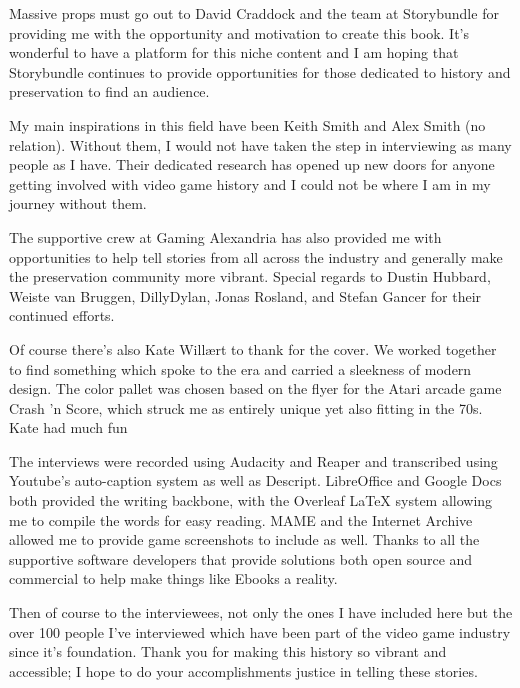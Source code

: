 \quad Massive props must go out to David Craddock and the team at Storybundle for providing me with the opportunity and motivation to create this book. It’s wonderful to have a platform for this niche content and I am hoping that Storybundle continues to provide opportunities for those dedicated to history and preservation to find an audience.

My main inspirations in this field have been Keith Smith and Alex Smith (no relation). Without them, I would not have taken the step in interviewing as many people as I have. Their dedicated research has opened up new doors for anyone getting involved with video game history and I could not be where I am in my journey without them.

The supportive crew at Gaming Alexandria has also provided me with opportunities to help tell stories from all across the industry and generally make the preservation community more vibrant. Special regards to Dustin Hubbard, Weiste van Bruggen, DillyDylan, Jonas Rosland, and Stefan Gancer for their continued efforts.

Of course there’s also Kate Willært to thank for the cover. We worked together to find something which spoke to the era and carried a sleekness of modern design. The color pallet was chosen based on the flyer for the Atari arcade game Crash 'n Score, which struck me as entirely unique yet also fitting in the 70s. Kate had much fun

The interviews were recorded using Audacity and Reaper and transcribed using Youtube’s auto-caption system as well as Descript. LibreOffice and Google Docs both provided the writing backbone, with the Overleaf LaTeX system allowing me to compile the words for easy reading. MAME and the Internet Archive allowed me to provide game screenshots to include as well. Thanks to all the supportive software developers that provide solutions both open source and commercial to help make things like Ebooks a reality.

Then of course to the interviewees, not only the ones I have included here but the over 100 people I’ve interviewed which have been part of the video game industry since it’s foundation. Thank you for making this history so vibrant and accessible; I hope to do your accomplishments justice in telling these stories.